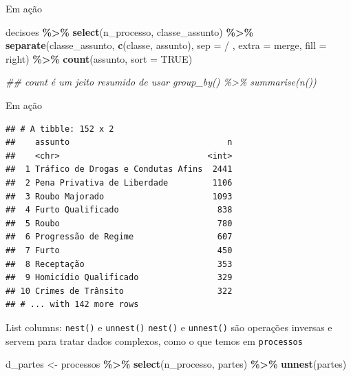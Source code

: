 \documentclass[
  9pt,
  ignorenonframetext,
]{beamer}
\newenvironment{Shaded}{\begin{snugshade}}{\end{snugshade}}
\newcommand{\CommentTok}[1]{\textcolor[rgb]{0.56,0.35,0.01}{\textit{#1}}}
\newcommand{\DataTypeTok}[1]{\textcolor[rgb]{0.13,0.29,0.53}{#1}}
\newcommand{\KeywordTok}[1]{\textcolor[rgb]{0.13,0.29,0.53}{\textbf{#1}}}
\newcommand{\NormalTok}[1]{#1}
\newcommand{\OperatorTok}[1]{\textcolor[rgb]{0.81,0.36,0.00}{\textbf{#1}}}
\newcommand{\OtherTok}[1]{\textcolor[rgb]{0.56,0.35,0.01}{#1}}
\newcommand{\StringTok}[1]{\textcolor[rgb]{0.31,0.60,0.02}{#1}}
\begin{document}
\begin{frame}[fragile]{Em ação}
\protect\hypertarget{em-auxe7uxe3o}{}
\begin{Shaded}
\begin{Highlighting}[]
\NormalTok{decisoes }\OperatorTok{\%\textgreater{}\%}\StringTok{ }
\StringTok{  }\KeywordTok{select}\NormalTok{(n\_processo, classe\_assunto) }\OperatorTok{\%\textgreater{}\%}\StringTok{ }
\StringTok{  }\KeywordTok{separate}\NormalTok{(classe\_assunto, }\KeywordTok{c}\NormalTok{(}\StringTok{\textquotesingle{}classe\textquotesingle{}}\NormalTok{, }\StringTok{\textquotesingle{}assunto\textquotesingle{}}\NormalTok{), }\DataTypeTok{sep =} \StringTok{\textquotesingle{} / \textquotesingle{}}\NormalTok{, }
           \DataTypeTok{extra =} \StringTok{\textquotesingle{}merge\textquotesingle{}}\NormalTok{, }\DataTypeTok{fill =} \StringTok{\textquotesingle{}right\textquotesingle{}}\NormalTok{) }\OperatorTok{\%\textgreater{}\%}\StringTok{ }
\StringTok{  }\KeywordTok{count}\NormalTok{(assunto, }\DataTypeTok{sort =} \OtherTok{TRUE}\NormalTok{)}

\CommentTok{\#\# count é um jeito resumido de usar group\_by() \%\textgreater{}\% summarise(n())}
\end{Highlighting}
\end{Shaded}
\end{frame}

\begin{frame}[fragile]{Em ação}
\protect\hypertarget{em-auxe7uxe3o-1}{}
\begin{verbatim}
## # A tibble: 152 x 2
##    assunto                                n
##    <chr>                              <int>
##  1 Tráfico de Drogas e Condutas Afins  2441
##  2 Pena Privativa de Liberdade         1106
##  3 Roubo Majorado                      1093
##  4 Furto Qualificado                    838
##  5 Roubo                                780
##  6 Progressão de Regime                 607
##  7 Furto                                450
##  8 Receptação                           353
##  9 Homicídio Qualificado                329
## 10 Crimes de Trânsito                   322
## # ... with 142 more rows
\end{verbatim}
\end{frame}

\begin{frame}[fragile]{List columns: \texttt{nest()} e
\texttt{unnest()}}
\protect\hypertarget{list-columns-nest-e-unnest}{}
\texttt{nest()} e \texttt{unnest()} são operações inversas e servem para
tratar dados complexos, como o que temos em \texttt{processos}

\begin{Shaded}
\begin{Highlighting}[]
\NormalTok{d\_partes \textless{}{-}}\StringTok{ }\NormalTok{processos }\OperatorTok{\%\textgreater{}\%}\StringTok{ }
\StringTok{  }\KeywordTok{select}\NormalTok{(n\_processo, partes) }\OperatorTok{\%\textgreater{}\%}\StringTok{ }
\StringTok{  }\KeywordTok{unnest}\NormalTok{(partes)}
\end{Highlighting}
\end{Shaded}
\end{frame}
\end{document}

